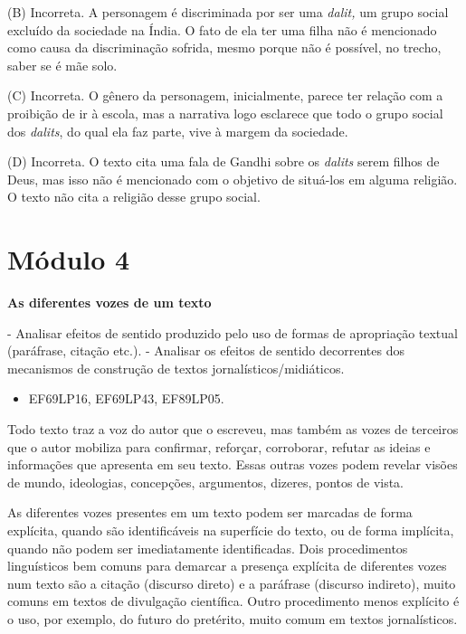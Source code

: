 (B) Incorreta. A personagem é discriminada por ser uma \emph{dalit,} um
grupo social excluído da sociedade na Índia. O fato de ela ter uma filha
não é mencionado como causa da discriminação sofrida, mesmo porque não é
possível, no trecho, saber se é mãe solo.

(C) Incorreta. O gênero da personagem, inicialmente, parece ter relação
com a proibição de ir à escola, mas a narrativa logo esclarece que todo
o grupo social dos \emph{dalits}, do qual ela faz parte, vive à margem
da sociedade.

(D) Incorreta. O texto cita uma fala de Gandhi sobre os \emph{dalits}
serem filhos de Deus, mas isso não é mencionado com o objetivo de
situá-los em alguma religião. O texto não cita a religião desse grupo
social.


\section{Módulo 4}

\textbf{As diferentes vozes de um texto}

 - Analisar efeitos de sentido produzido
pelo uso de formas de apropriação textual (paráfrase, citação etc.). -
Analisar os efeitos de sentido decorrentes dos mecanismos de construção
de textos jornalísticos/midiáticos.


\begin{itemize}
\tightlist
\item
  EF69LP16, EF69LP43, EF89LP05.
\end{itemize}

Todo texto traz a voz do autor que o escreveu, mas também as vozes de
terceiros que o autor mobiliza para confirmar, reforçar, corroborar,
refutar as ideias e informações que apresenta em seu texto. Essas outras
vozes podem revelar visões de mundo, ideologias, concepções, argumentos,
dizeres, pontos de vista.

As diferentes vozes presentes em um texto podem ser marcadas de forma
explícita, quando são identificáveis na superfície do texto, ou de forma
implícita, quando não podem ser imediatamente identificadas. Dois
procedimentos linguísticos bem comuns para demarcar a presença explícita
de diferentes vozes num texto são a citação (discurso direto) e a
paráfrase (discurso indireto), muito comuns em textos de divulgação
científica. Outro procedimento menos explícito é o uso, por exemplo, do
futuro do pretérito, muito comum em textos jornalísticos.

